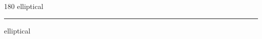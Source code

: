 
\begin{frame}
\begin{center}
\begin{turn}{180}
{\fontsize{2.5cm}{1em}\selectfont elliptical}
\end{turn}
\vspace{1em}\par  
\hrule
\vspace{1em}\par  
{\fontsize{2.5cm}{1em}\selectfont elliptical}
\end{center}
\end{frame}
